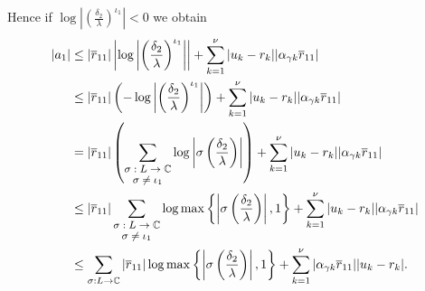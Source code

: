 Hence if $\log\left|\left(\frac{\delta_2}{\lambda}\right)^{\iota_1}\right| < 0$ we obtain
\begin{align*}
|a_1|	& \leq |\overline{r}_{11}|\left|\log\left|\left(\frac{\delta_2}{\lambda}\right)^{\iota_1}\right|\right| + \sum_{k=1}^{\nu}|u_k-r_k||\alpha_{\gamma k}\overline{r}_{11}|\\
		& \leq |\overline{r}_{11}|\left(-\log\left|\left(\frac{\delta_2}{\lambda}\right)^{\iota_1}\right|\right) + \sum_{k=1}^{\nu}|u_k-r_k||\alpha_{\gamma k}\overline{r}_{11}|\\
		& = |\overline{r}_{11}|\left(\sum_{\shortstack{\footnotesize $\sigma: L \to \mathbb{C} $\\ \footnotesize $ \sigma \neq \iota_1$}} \log\left|\sigma \left(\frac{\delta_2}{\lambda}\right)\right|\right) + \sum_{k=1}^{\nu}|u_k-r_k||\alpha_{\gamma k}\overline{r}_{11}|\\
		& \leq |\overline{r}_{11}|\sum_{\shortstack{\footnotesize $\sigma: L \to \mathbb{C} $\\ \footnotesize $ \sigma \neq \iota_1$}}\log\max\left\{\left|\sigma\left(\frac{\delta_2}{\lambda}\right)\right|, 1 \right\} + \sum_{k=1}^{\nu}|u_k-r_k||\alpha_{\gamma k}\overline{r}_{11}|\\
		& \leq \sum_{\sigma: L \to \mathbb{C}}|\overline{r}_{11}|\log\max \left\{\left|\sigma \left(\frac{\delta_2}{\lambda}\right)\right|,1\right\} + \sum_{k=1}^{\nu}|\alpha_{\gamma k}\overline{r}_{11}||u_k-r_k|.
\end{align*}

